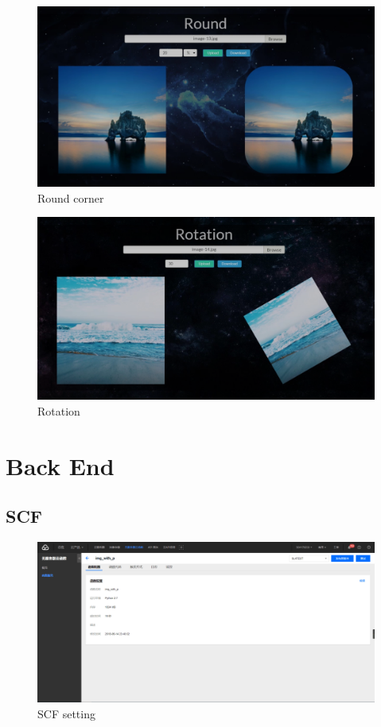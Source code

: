 \documentclass[a4paper,12pt]{article}
\begin{document}
\begin{figure}[H]
\centering
\includegraphics[scale=0.34]{figures/demo2.png}
\caption{\label{fig:demo2}Round corner}
\end{figure}

\begin{figure}[H]
\centering
\includegraphics[scale=0.34]{figures/demo3.png}
\caption{\label{fig:demo3}Rotation}
\end{figure}


\section{Back End}

\subsection{SCF}

\begin{figure}[H]
\centering
\includegraphics[scale=0.21]{figures/SCF2.png}
\caption{\label{fig:scf2}SCF setting}
\end{figure}
\end{document}
